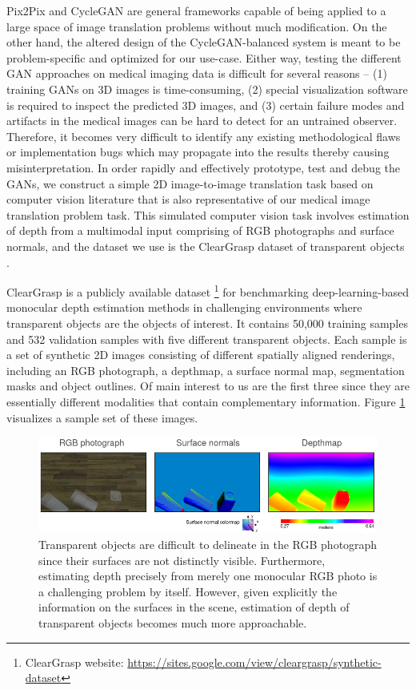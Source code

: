 Pix2Pix and CycleGAN are general frameworks capable of being applied to a large space of image translation problems without much modification. On the other hand, the altered design of the CycleGAN-balanced system is meant to be problem-specific and optimized for our use-case. Either way, testing the different GAN approaches on medical imaging data is difficult for several reasons -- (1) training GANs on 3D images is time-consuming, (2) special visualization software is required to inspect the predicted 3D images, and (3) certain failure modes and artifacts in the medical images can be hard to detect for an untrained observer. Therefore, it becomes very difficult to identify any existing methodological flaws or implementation bugs which may propagate into the results thereby causing misinterpretation. In order rapidly and effectively prototype, test and debug the GANs, we construct a simple 2D image-to-image translation task based on computer vision literature that is also representative of our medical image translation problem task. This simulated computer vision task involves estimation of depth from a multimodal input comprising of RGB photographs and surface normals, and the dataset we use is the ClearGrasp dataset of transparent objects \cite{sajjan2020clear}.

ClearGrasp is a publicly available dataset \footnote{ClearGrasp website: \url{https://sites.google.com/view/cleargrasp/synthetic-dataset}} for benchmarking deep-learning-based monocular depth estimation methods in challenging environments where transparent objects are the objects of interest. It contains 50,000 training samples and 532 validation samples with five different transparent objects. Each sample is a set of synthetic 2D images consisting of different spatially aligned renderings, including an RGB photograph, a depthmap, a surface normal map, segmentation masks and object outlines. Of main interest to us are the first three since they are essentially different modalities that contain complementary information. Figure \ref{fig:cleargrasp_sample} visualizes a sample set of these images. 

\begin{figure}[h!]
    \centering
    \includegraphics[width=\linewidth]{figures/Cleargrasp_data/cleargrasp_sample.png}
    \caption{Transparent objects are difficult to delineate in the RGB photograph since their surfaces are not distinctly visible. Furthermore, estimating depth precisely from merely one monocular RGB photo is a challenging problem by itself. However, given explicitly the information on the surfaces in the scene, estimation of depth of transparent objects becomes much more approachable.}
    \label{fig:cleargrasp_sample}
\end{figure}{}

